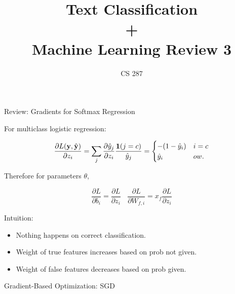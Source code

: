 \documentclass{beamer}
\title{Text Classification\\ + \\ Machine Learning Review 3 }
\date{}
\author{CS 287}
\begin{document}
\begin{frame}
  \titlepage
\end{frame}

\begin{frame}{Review: Gradients for Softmax Regression}

  For multiclass logistic regression:
  
  \[ \frac{\partial L(\mathbf{y}, \hat{\mathbf{y}})}{\partial z_i} = \sum_{j} \frac{\partial \hat{y}_j }{\partial z_i}  \frac{\mathbf{1}(j = c)} {\hat{y}_j} =     \begin{cases}
      -(1 - \hat{y}_i) & i = c\\
      \hat{y}_i & ow. \\
    \end{cases} \] 

  Therefore for parameters $\theta$, 

  \[\frac{\partial L}{\partial b_{i}} = 
    \frac{\partial L}{\partial z_{i}} \ \ \ \ \frac{\partial L}{\partial W_{f, i}} = 
     x_f \frac{\partial L}{\partial z_{i}}\]

   \pause
   Intuition:
   \begin{itemize}
   \item Nothing happens on correct classification.
   \item Weight of true features increases based on prob not given.
   \item Weight of false features decreases based on prob given.
   \end{itemize}
\end{frame}


\begin{frame}{Gradient-Based Optimization: SGD}
  \begin{figure}
    \begin{algorithmic}
      \State{$\theta \gets \theta - \eta \hat{\boldg}$}
      \EndWhile{}
      \State{\Return{$\theta$}}
      \EndProcedure{}
    \end{algorithmic}
  \end{figure}
\end{frame}
\end{document}
